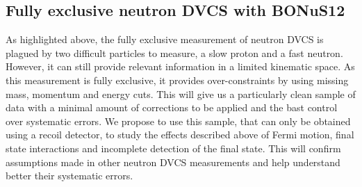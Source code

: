\subsection{Fully exclusive neutron DVCS with BONuS12}

As highlighted above, the fully exclusive measurement of neutron DVCS is plagued by
two difficult particles to measure, a slow proton and a fast neutron. However, it can 
still provide relevant information in a limited kinematic space. As this measurement is
fully exclusive, it provides over-constraints by using missing mass, momentum and energy 
cuts. This will give us a particularly clean sample of data with a minimal amount of 
corrections to be applied and the bast control over systematic errors. We propose to use 
this sample, that can only be obtained using a recoil detector, to study the effects 
described above of Fermi motion, final state interactions and incomplete detection of the
final state. This will confirm assumptions made in other neutron DVCS measurements and
help understand better their systematic errors.



